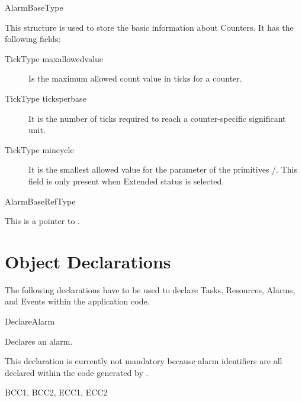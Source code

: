 \begin{type}{AlarmBaseType}
  \begin{typedescription}
    This structure is used to store the basic information about
    Counters. It has the following fields:
    \begin{description}
    \item[TickType maxallowedvalue] Is the maximum allowed count value
      in ticks for a counter.
    \item[TickType ticksperbase] It is the number of ticks required to
      reach a counter-specific significant unit.
    \item[TickType mincycle] It is the smallest allowed value for the
       parameter of the primitives 
      /. This field is only
      present when Extended status is selected.
    \end{description}
  \end{typedescription}
\end{type}

\begin{type}{AlarmBaseRefType}
  \begin{typedescription}
    This is a pointer to .
  \end{typedescription}
\end{type}


\pagebreak









\section{Object Declarations}
The following declarations have to be used to declare Tasks, Resources,
Alarms, and Events within the application code.

\begin{function_nopb}{DeclareAlarm}
  \begin{fundescription}
    Declares an alarm.

    This declaration is currently not mandatory because alarm
    identifiers are all declared within the code generated by \rtd.
  \end{fundescription}
  \begin{funconformance}
    BCC1, BCC2, ECC1, ECC2
  \end{funconformance}
\end{function_nopb}

